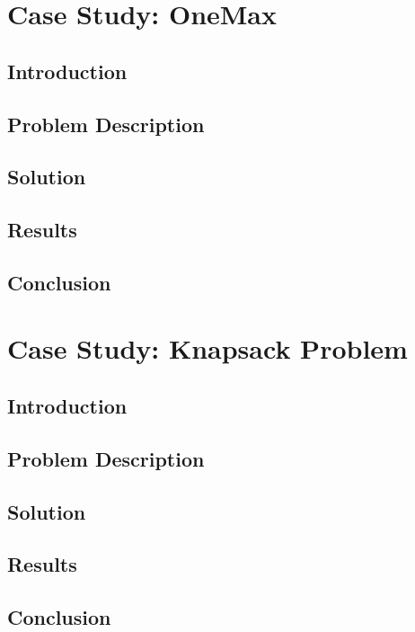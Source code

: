 \chapter{Case Study: OneMax}
\label{chap:case_study_onemax}
  \section{Introduction}
  \label{sec:introduction}
    \Blindtext
  \section{Problem Description}
  \label{sec:problem_description}
    \Blindtext
  \section{Solution}
  \label{sec:solution}
    \Blindtext
  \section{Results}
  \label{sec:results}
    \Blindtext
  \section{Conclusion}
  \label{sec:conclusion}
    \Blindtext

\chapter{Case Study: Knapsack Problem}
\label{chap:case_study_knapsack}
  \section{Introduction}
  \label{sec:introduction}
    \Blindtext
  \section{Problem Description}
  \label{sec:problem_description}
    \Blindtext
  \section{Solution}
  \label{sec:solution}
    \Blindtext
  \section{Results}
  \label{sec:results}
    \Blindtext
  \section{Conclusion}
  \label{sec:conclusion}
    \Blindtext

